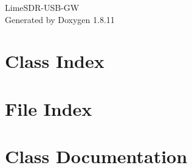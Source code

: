 \documentclass[twoside]{article}
\newcommand{\+}{\discretionary{\mbox{\scriptsize$\hookleftarrow$}}{}{}}
\begin{document}
\begin{titlepage}
\vspace*{7cm}
\begin{center}%
{\Large Lime\+S\+D\+R-\/\+U\+S\+B-\/\+GW }\\
\vspace*{1cm}
{\large Generated by Doxygen 1.8.11}\\
\end{center}
\end{titlepage}
\tableofcontents
{}

\section{Class Index}

\section{File Index}

\section{Class Documentation}


















\end{document}
